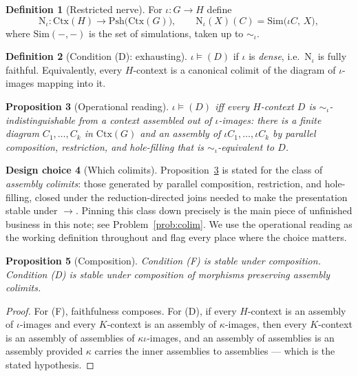 \documentclass[11pt,a4paper]{article}
\theoremstyle{definition}
\newtheorem{definition}{Definition}[section]
\newtheorem{design}[definition]{Design choice}
\theoremstyle{plain}
\newtheorem{proposition}[definition]{Proposition}
\theoremstyle{remark}
\newcommand{\Ctx}{\mathrm{Ctx}}
\newcommand{\Sim}{\mathrm{Sim}}
\newcommand{\Psh}{\mathrm{Psh}}
\newcommand{\Nerve}{\mathrm{N}}
\begin{document}
\begin{definition}[Restricted nerve]
\label{def:nerve}
For $\iota : G \to H$ define
\[
\Nerve_\iota : \Ctx(H) \longrightarrow \Psh\bigl(\Ctx(G)\bigr),
\qquad
\Nerve_\iota(X)(C) = \Sim\bigl(\iota C,\, X\bigr),
\]
where $\Sim(-,-)$ is the set of simulations, taken up to $\sim_\iota$.
\end{definition}

\begin{definition}[Condition (D): exhausting]
\label{def:D}
$\iota \models (D)$ if $\iota$ is \emph{dense}, i.e.\ $\Nerve_\iota$ is fully
faithful. Equivalently, every $H$-context is a canonical colimit of the diagram of
$\iota$-images mapping into it.
\end{definition}

\begin{proposition}[Operational reading]
\label{prop:Dop}
$\iota \models (D)$ iff every $H$-context $D$ is $\sim_\iota$-indistinguishable from
a context assembled out of $\iota$-images: there is a finite diagram
$C_1,\dots,C_k$ in $\Ctx(G)$ and an assembly of $\iota C_1, \dots, \iota C_k$ by
parallel composition, restriction, and hole-filling that is $\sim_\iota$-equivalent
to $D$.
\end{proposition}

\begin{design}[Which colimits]
\label{des:colim}
Proposition~\ref{prop:Dop} is stated for the class of \emph{assembly colimits}:
those generated by parallel composition, restriction, and hole-filling, closed under
the reduction-directed joins needed to make the presentation stable under $\to$.
Pinning this class down precisely is the main piece of unfinished business in this
note; see Problem~\ref{prob:colim}. We use the operational reading as the working
definition throughout and flag every place where the choice matters.
\end{design}

\begin{proposition}[Composition]
\label{prop:compose}
Condition (F) is stable under composition. Condition (D) is stable under composition
of morphisms preserving assembly colimits.
\end{proposition}

\begin{proof}
For (F), faithfulness composes. For (D), if every $H$-context is an assembly of
$\iota$-images and every $K$-context is an assembly of $\kappa$-images, then every
$K$-context is an assembly of assemblies of $\kappa\iota$-images, and an assembly of
assemblies is an assembly provided $\kappa$ carries the inner assemblies to
assemblies --- which is the stated hypothesis.
\end{proof}
\end{document}
